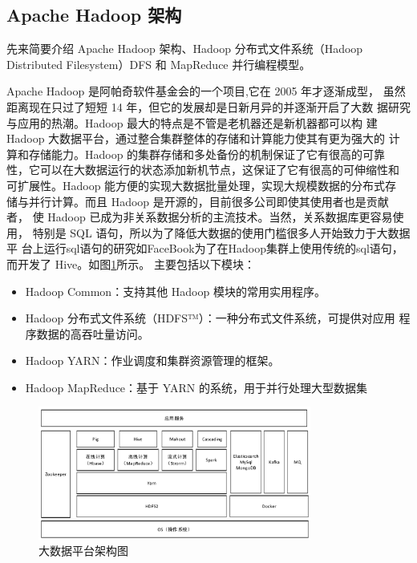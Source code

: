 \documentclass[UTF8,a4paper,10pt,nocolorlinks]{ctexart}
\begin{document}
\subsection{Apache Hadoop 架构}
先来简要介绍 Apache Hadoop 架构、Hadoop 分布式文件系统（Hadoop 
Distributed Filesystem）DFS 和 MapReduce 并行编程模型。
\par Apache  Hadoop  是阿帕奇软件基金会的一个项目,它在 2005 年才逐渐成型，
虽然距离现在只过了短短 14 年，但它的发展却是日新月异的并逐渐开启了大数
据研究与应用的热潮。Hadoop 最大的特点是不管是老机器还是新机器都可以构
建 Hadoop 大数据平台，通过整合集群整体的存储和计算能力使其有更为强大的
计算和存储能力。Hadoop 的集群存储和多处备份的机制保证了它有很高的可靠
性，它可以在大数据运行的状态添加新机节点，这保证了它有很高的可伸缩性和
可扩展性。Hadoop 能方便的实现大数据批量处理，实现大规模数据的分布式存
储与并行计算。而且 Hadoop 是开源的，目前很多公司即使其使用者也是贡献者，
使 Hadoop 已成为非关系数据分析的主流技术。当然，关系数据库更容易使用，
特别是 SQL 语句，所以为了降低大数据的使用门槛很多人开始致力于大数据平
台上运行sql语句的研究如FaceBook为了在Hadoop集群上使用传统的sql语句，
而开发了 Hive。如图\ref{bigdata1}所示。
主要包括以下模块： 
\begin{itemize}
  \item [(1)] 
  Hadoop Common：支持其他 Hadoop 模块的常用实用程序。 
  \item [(2)]
  Hadoop 分布式文件系统（HDFS™）：一种分布式文件系统，可提供对应用
程序数据的高吞吐量访问。
\item [(3)] 
Hadoop YARN：作业调度和集群资源管理的框架。
\item [(4)] 
Hadoop  MapReduce：基于 YARN 的系统，用于并行处理大型数据集
\end{itemize}

\begin{figure}[h]
  \centering %
  \includegraphics[width=0.8\textwidth]{bigdata_1.png} %
  \caption{大数据平台架构图}
  \label{bigdata1}
\end{figure}
\end{document}
